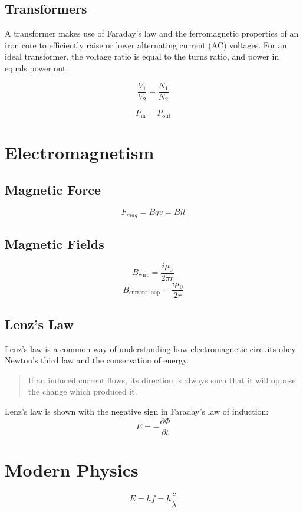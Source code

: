 \documentclass[oneside]{book} %
\theoremstyle{plain}
\begin{document}
\section{Transformers}
A transformer makes use of Faraday's law and the ferromagnetic properties of an
iron core to efficiently raise or lower alternating current (AC) voltages.
For an ideal transformer, the voltage ratio is equal to the turns ratio, and
power in equals power out.

\[\frac{V_1}{V_2} = \frac{N_1}{N_2}\]

\[P_{\text{in}} = P_{\text{out}}\]


\chapter{Electromagnetism}

\section{Magnetic Force}
\[F_{mag} = B q v = B i l\]

\section{Magnetic Fields}
\[B_{\text{wire}} = \frac{i \mu_0}{2 \pi r}\]
\[B_{\text{current loop}} = \frac{i \mu_0}{2 r}\]

\section{Lenz's Law}
Lenz's law is a common way of understanding how electromagnetic circuits obey
Newton's third law and the conservation of energy.
\begin{quote}
If an induced current flows, its direction is always such that it will oppose
the change which produced it.
\end{quote}
Lenz's law is shown with the negative sign in Faraday's law of induction:
\[{E}=-\frac{\partial \Phi}{\partial t}\]


\chapter{Modern Physics}
\[E = hf = h\frac{c}{\lambda}\]
\end{document}
